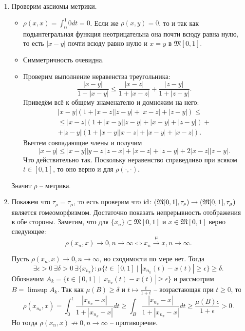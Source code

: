 \begin{solve}
    \begin{enumerate}
        \item Проверим аксиомы метрики.
        \begin{itemize}
            \item $\rho(x, x) = \int_0^1 0dt = 0$. Если же $\rho(x, y) = 0$, то и так как подынтегральная функция неотрицательна она почти всюду равна нулю, то есть $|x - y|$ почти всюду равно нулю и $x = y$ в $\mathfrak{M}[0, 1]$.
            \item Симметричность очевидна.
            \item Проверим выполнение неравенства треугольника:
            \[
                \dfrac{|x - y|}{1 + |x - y|} \leq \dfrac{|x - z|}{1 + |x - z|} + \dfrac{|z - y|}{1 + |z - y|}.
            \]
            Приведём всё к общему знаменателю и домножим на него:
            \begin{multline*}
                |x - y|(1 + |x - z||z - y| + |x - z| + |z - y|) \leq \\ \leq  |x - z|(1 + |x - y||z - y| + |x - y| + |z - y|) +  \\ + |z - y|(1 + |x - y||x - z| + |x - y| + |x - z|).
            \end{multline*}
            Вычтем совпадающие члены и получим
            \[
                |x - y| \leq |x - y||y - z||z - x| + |x - z| + |z - y| + 2|x - z||z - y|.
            \]
            Что действительно так. Поскольку неравенство справедливо при всяком $t \in [0, 1]$, то оно верно и для $\rho(\cdot, \cdot)$.
        \end{itemize}
        Значит $\rho$ -- метрика.
        \item Покажем что $\tau_\rho = \tau_\mu$, то есть проверим что $\mathrm{id}\colon (\mathfrak{M}[0, 1], \tau_{\rho}) \to (\mathfrak{M}[0, 1], \tau_\mu)$ является гомеоморфизмом. Достаточно показать непрерывность отображения в обе стороны. Заметим, что для $\{x_n\} \subset \mathfrak{M}[0, 1]$ и $x \in \mathfrak{M}[0, 1]$ верно следующее:
        \[
            \rho(x_n, x) \rightarrow 0, n \rightarrow \infty \Longleftrightarrow x_n \xrightarrow{\mu} x, n \rightarrow \infty.
        \]

        Пусть $\rho(x_n, x) \rightarrow 0, n \rightarrow \infty$, но сходимости по мере нет. Тогда
        \[
            \exists \epsilon > 0 \  \exists\delta > 0 \ \exists \{x_{n_k}\} \colon \mu\{t \in [0, 1] \mid |x_{n_k}(t) - x(t)| \geq \epsilon\} \geq \delta.
        \]
        Обозначим $A_k = \{t \in [0, 1] \mid |x_{n_k}(t) - x(t)| \geq \epsilon\}$ и рассмотрим $B = \limsup A_k$. Так как $\mu(B) \geq \delta$ и $t \mapsto \frac{t}{1 + t}$ -- возрастающая при $t \geq 0$, то
        \[
            \rho(x_{n_k}, x) = \int_0^1 \frac{|x_{n_k} - x|}{1 + |x_{n_k} - x|}dt \geq \int_B \dfrac{|x_{n_k} - x|}{1 +|x_{n_k} - x|}dt \geq \frac{\mu(B) \epsilon}{1 + \epsilon} > 0.
        \]
        Но тогда $\rho(x_n, x) \not\rightarrow 0, n \rightarrow \infty$ -- противоречие.


\end{enumerate}
\end{solve}
